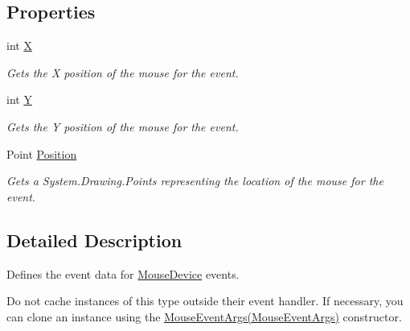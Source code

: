 \subsection*{Properties}
\begin{DoxyCompactItemize}
\item 
int \hyperlink{class_open_t_k_1_1_input_1_1_mouse_event_args_a160e6935affdb80c8e39a24e8aa7481d}{X}
\begin{DoxyCompactList}\small\item\em Gets the X position of the mouse for the event. \end{DoxyCompactList}\item 
int \hyperlink{class_open_t_k_1_1_input_1_1_mouse_event_args_a303956e7ce1e2a90cb76519ed63de5df}{Y}
\begin{DoxyCompactList}\small\item\em Gets the Y position of the mouse for the event. \end{DoxyCompactList}\item 
Point \hyperlink{class_open_t_k_1_1_input_1_1_mouse_event_args_af30ca9ad72ab907e1e6428a4097e60a5}{Position}
\begin{DoxyCompactList}\small\item\em Gets a System.\-Drawing.\-Points representing the location of the mouse for the event. \end{DoxyCompactList}\end{DoxyCompactItemize}


\subsection{Detailed Description}
Defines the event data for \hyperlink{class_open_t_k_1_1_input_1_1_mouse_device}{Mouse\-Device} events. 

Do not cache instances of this type outside their event handler. If necessary, you can clone an instance using the \hyperlink{class_open_t_k_1_1_input_1_1_mouse_event_args_a6c439ae6a66a4e3dc0de1d855246accb}{Mouse\-Event\-Args(\-Mouse\-Event\-Args)} constructor. 

